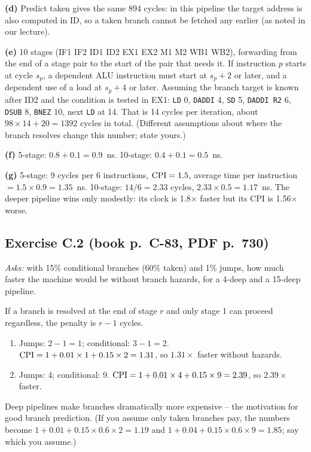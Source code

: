\documentclass[11pt]{article}
\newcommand{\ex}[3]{\subsection*{Exercise #1 \normalfont\small(book p.~#2, PDF p.~#3)}%
  \addcontentsline{toc}{subsection}{Exercise #1}}
\begin{document}
\begin{solution}
\textbf{(d)} Predict taken gives the same 894 cycles: in this pipeline the
target address is also computed in ID, so a taken branch cannot be
fetched any earlier (as noted in our lecture).

\textbf{(e)} 10 stages (IF1 IF2 ID1 ID2 EX1 EX2 M1 M2 WB1 WB2), forwarding
from the end of a stage pair to the start of the pair that needs it. If
instruction $p$ starts at cycle $s_p$, a dependent ALU instruction must start
at $s_p+2$ or later, and a dependent use of a load at $s_p+4$ or later.
Assuming the branch target is known after ID2 and the condition is tested in
EX1: \texttt{LD} 0, \texttt{DADDI} 4, \texttt{SD} 5, \texttt{DADDI R2} 6,
\texttt{DSUB} 8, \texttt{BNEZ} 10, next \texttt{LD} at 14. That is 14 cycles
per iteration, about $98\times14 + 20 = 1392$ cycles in total. (Different
assumptions about where the branch resolves change this number; state
yours.)

\textbf{(f)} 5-stage: $0.8 + 0.1 = 0.9$~ns. 10-stage: $0.4 + 0.1 =
0.5$~ns.

\textbf{(g)} 5-stage: 9 cycles per 6 instructions, $\mathrm{CPI} = 1.5$, average
time per instruction $=1.5\times0.9 = 1.35$~ns. 10-stage: $14/6 = 2.33$
cycles, $2.33\times0.5 = 1.17$~ns. The deeper pipeline wins only modestly:
its clock is 1.8$\times$ faster but its CPI is 1.56$\times$ worse.
\end{solution}

\ex{C.2}{C-83}{730}
\emph{Asks:} with 15\% conditional branches (60\% taken) and 1\% jumps, how
much faster the machine would be without branch hazards, for a 4-deep and
a 15-deep pipeline.
\begin{solution}
If a branch is resolved at the end of stage $r$ and only stage 1 can proceed
regardless, the penalty is $r-1$ cycles.
\begin{enumerate}[label=(\alph*),leftmargin=*]
  \item Jumps: $2-1 = 1$; conditional: $3-1 = 2$.
  $\mathrm{CPI} = 1 + 0.01\times1 + 0.15\times2 = 1.31$, so $1.31\times$ faster
  without hazards.
  \item Jumps: 4; conditional: 9. $\mathrm{CPI} = 1 + 0.01\times4 + 0.15\times9 =
  2.39$, so $2.39\times$ faster.
\end{enumerate}
Deep pipelines make branches dramatically more expensive -- the motivation
for good branch prediction. (If you assume only taken branches pay, the
numbers become $1 + 0.01 + 0.15\times0.6\times2 = 1.19$ and $1 + 0.04 +
0.15\times0.6\times9 = 1.85$; say which you assume.)
\end{solution}
\end{document}
